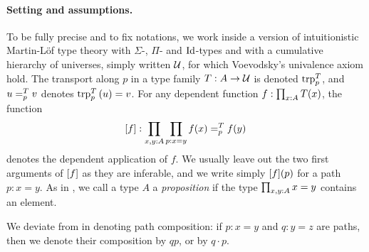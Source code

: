 \documentclass[english,a4paper]{lmcs}
\begin{document}
\paragraph{Setting and assumptions.}
To be fully precise and to fix notations, we work inside a version of
intuitionistic Martin-L\"of type theory with $\Sigma$-, $\Pi$- and
$\Id$-types and with a cumulative hierarchy of universes,
simply written $\UU$, for which Voevodsky's univalence axiom hold. The
transport along $p$ in a type family $T:A\to \UU$ is denoted
$\trp [T] p$, and $\pathover u T p v$ denotes $\trp [T] p {(u)} = v$.
For any dependent function $f\from\prod_{x\from A}T(x)$,
the function
\begin{displaymath}
  \ap f:\prod_{x,y\from A}\prod_{p\from x=y} \pathover {f(x)} T p
  {f(y)}
\end{displaymath}
denotes the dependent application of $f$. We usually leave out the two
first arguments of $\ap f$ as they are inferable, and we write simply
$\ap f (p)$ for a path $p:x=y$. As in \cite{HoTT}, we call a type $A$
a \emph{proposition} if the type $\prod_{x,y\from A} x=y$ contains an
element.

We deviate from \cite{HoTT} in denoting path composition:
if $p:x=y$ and $q:y=z$ are paths, then we denote their
composition by $qp$, or by $q\cdot p$.
\end{document}
